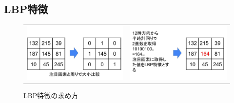 \documentclass[titlepage,dvipdfmx]{jsarticle}
\begin{document}
\subsection{LBP特徴}
\begin{figure}[t]
  \centering
  \begin{tabular}{cc}
    \begin{minipage}[b]{0.5\linewidth}
      \centering
      \includegraphics[pagebox=cropbox, scale=0.25]{LBP.jpg}
    \end{minipage}
    &
    \begin{minipage}[b]{0.5\linewidth}
      \centering
      \includegraphics[pagebox=cropbox, scale=0.25]{LBP2.jpg}
    \end{minipage}
  \end{tabular}
  \caption{LBP特徴の求め方}
  \label{LBP}  
\end{figure}
\end{document}
